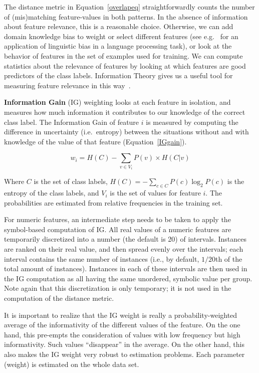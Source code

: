 \documentclass{report}
\begin{document}
The distance metric in Equation~\ref{overlapeq} straightforwardly counts the
number of (mis)matching feature-values in both patterns. In the
absence of information about feature relevance, this is a reasonable
choice. Otherwise, we can add domain knowledge bias to weight or
select different features (see e.g.~ for an
application of linguistic bias in a language processing task), or look
at the behavior of features in the set of examples used for
training. We can compute statistics about the relevance of features by
looking at which features are good predictors of the class
labels. Information Theory gives us a useful tool for measuring
feature relevance in this way~\cite{Quinlan86,Quinlan93}.

{\bf Information Gain} (IG) weighting looks at each feature in
isolation, and measures how much information it contributes to our
knowledge of the correct class label. The Information Gain of feature
$i$ is measured by computing the difference in uncertainty
(i.e.\ entropy) between the situations without and with knowledge of
the value of that feature (Equation~\ref{IGgain}).

\begin{equation}
w_{i} = H(C) -  \sum_{v \in V_{i}} P(v) \times H(C|v)
\label{IGgain}
\end{equation}

Where $C$ is the set of class labels, $H(C) = - \sum_{c \in C} P(c)
\log_{2} P(c)$ is the entropy of the class labels, and $V_{i}$ is the
set of values for feature $i$. The probabilities are estimated from
relative frequencies in the training set.

For numeric features, an intermediate step needs to be taken to apply
the symbol-based computation of IG. All real values of a numeric
features are temporarily discretized into a number (the default is 20)
of intervals. Instances are ranked on their real value, and then
spread evenly over the intervals; each interval contains the same
number of instances (i.e., by default, $1/20$th of the total amount of
instances). Instances in each of these intervals are then used in the
IG computation as all having the same unordered, symbolic value per
group. Note again that this discretization is only temporary; it is
not used in the computation of the distance metric.

It is important to realize that the IG weight is really a
probability-weighted average of the informativity of the different
values of the feature. On the one hand, this pre-empts the
consideration of values with low frequency but high
informativity. Such values ``disappear'' in the average. On the other
hand, this also makes the IG weight very robust to estimation
problems. Each parameter (weight) is estimated on the whole data set.
\end{document}
